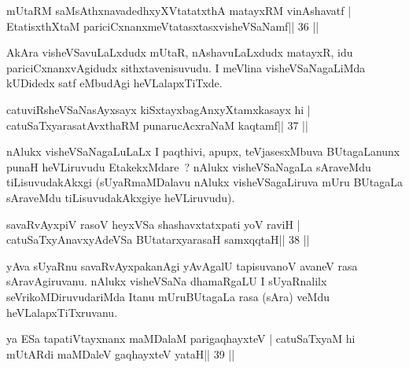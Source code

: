 

\begin{shl}
mUtaRM saMsAthxnavadedhxyXVtatatxthA matayxRM vinAshavatf |
EtatisxthXtaM pariciCxnanxmeVtatasxtasxvisheVSaNamf\hfill || 36 ||
\end{shl}

\begin{artha}
AkAra visheVSavuLaLxdudx mUtaR, nAshavuLaLxdudx matayxR, idu
pariciCxnanxvAgidudx sithxtavenisuvudu. I meVlina visheVSaNagaLiMda
kUDidedx satf eMbudAgi heVLalapxTiTxde.
\end{artha}

\begin{shl}
\footnotemark[1]catuviRsheVSaNasAyxsayx kiSxtayxbagAnxyXtamxkasayx hi |
\footnotemark[1]catuSaTxyarasatAvxthaRM punarucAcxraNaM kaqtamf\hfill || 37 ||
\end{shl}

\begin{artha}
nAlukx visheVSaNagaLuLaLx I paqthivi, apupx, teVjasesxMbuva BUtagaLanunx punaH heVLiruvudu EtakekxMdare~? nAlukx visheVSaNagaLa sAraveMdu tiLisuvudakAkxgi  (sUyaRmaMDalavu nAlukx visheVSagaLiruva mUru BUtagaLa sAraveMdu tiLisuvudakAkxgiye heVLiruvudu).
\end{artha}



\begin{shl}
savaRvAyxpiV rasoV heyxVSa shashavxtatxpati yoV raviH |
\footnotemark[1]catuSaTxyAnavxyAdeVSa BUtatarxyarasaH samxqqtaH\hfill || 38 ||
\end{shl}

\begin{artha}
yAva sUyaRnu savaRvAyxpakanAgi yAvAgalU tapisuvanoV avaneV rasa sAravAgiruvanu. nAlukx visheVSaNa dhamaRgaLU I sUyaRnalilx seVrikoMDiruvudariMda Itanu mUruBUtagaLa rasa (sAra) veMdu heVLalapxTiTxruvanu.
\end{artha}



\begin{shl}
ya ESa tapatiVtayxnanx maMDalaM parigaqhayxteV |
catuSaTxyaM hi mUtARdi maMDaleV gaqhayxteV yataH\hfill || 39 ||
\end{shl}


